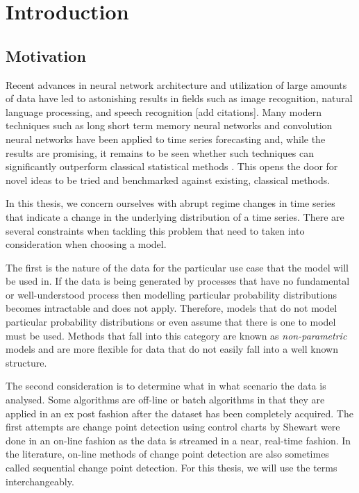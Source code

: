 \chapter{Introduction}
\section{Motivation}
Recent advances in neural network architecture and utilization of large amounts of data have led to astonishing results in fields such as image recognition, natural language processing, and speech recognition [add citations]. Many modern techniques such as long short term memory neural networks and convolution neural networks have been applied to time series forecasting and, while the results are promising, it remains to be seen whether such techniques can significantly outperform classical statistical methods \cite{makridakis2018statistical}. This opens the door for novel ideas to be tried and benchmarked against existing, classical methods.

In this thesis, we concern ourselves with abrupt regime changes in time series that indicate a change in the underlying distribution of a time series. There are several constraints when tackling this problem that need to taken into consideration when choosing a model. 

The first is the nature of the data for the particular use case that the model will be used in. If the data is being generated by processes that have no fundamental or well-understood process then modelling particular probability distributions becomes intractable and does not apply. Therefore, models that do not model particular probability distributions or even assume that there is one to model must be used. Methods that fall into this category are known as \textit{non-parametric} models and are more flexible for data that do not easily fall into a well known structure.%

The second consideration is to determine what in what scenario the data is analysed. Some algorithms are off-line or batch algorithms in that they are applied in an ex post fashion after the dataset has been completely acquired. The first attempts are change point detection using control charts by Shewart were done in an on-line fashion as the data is streamed in a near, real-time fashion. In the literature, on-line methods of change point detection are also sometimes called sequential change point detection. For this thesis, we will use the terms interchangeably.  %

